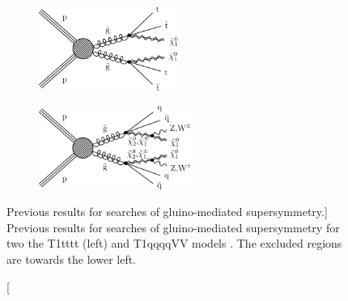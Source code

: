 \begin{figure}
\begin{subfigure}{0.45\textwidth}
\centering
\includegraphics[width=0.5\textwidth]{figs/CMS-SUS-16-033_Figure_001-a.pdf}  
\end{subfigure}
\begin{subfigure}{0.45\textwidth}
\centering
\includegraphics[width=0.55\textwidth]{figs/CMS-SUS-16-033_Figure_001-c.pdf}
\end{subfigure}
\caption
[Previous results for searches of gluino-mediated supersymmetry.]
{Previous results for searches of gluino-mediated supersymmetry for two the T1tttt (left) and T1qqqqVV models \cite{CMS-SUS-16-033}. The excluded regions are towards the lower left.}
\label{fig:oldlimits}
\end{figure} 

